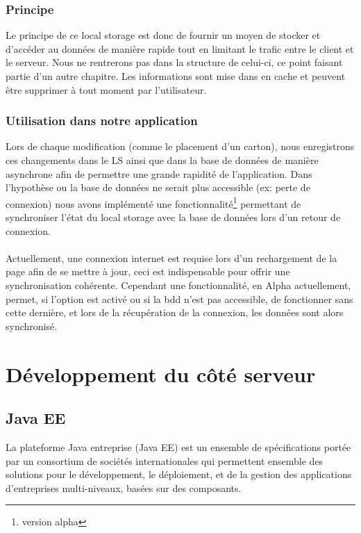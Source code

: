 \subsubsection{Principe}
Le principe de ce local storage est donc de fournir un moyen de stocker et d'accéder au données de manière rapide tout en limitant le trafic entre le client et le serveur. Nous ne rentrerons pas dans la structure de celui-ci, ce point faisant partie d'un autre chapitre. Les informations sont mise dans en cache et peuvent être supprimer à tout moment par l'utilisateur.
\subsubsection{Utilisation dans notre application}
Lors de chaque modification (comme le placement d'un carton), nous enregistrons ces changements dans le LS ainsi que dans la base de données de manière asynchrone afin de permettre une grande rapidité de l'application. Dans l'hypothèse ou la base de données ne serait plus accessible (ex: perte de connexion) nous avons implémenté une fonctionnalité\footnote{version alpha} permettant de synchroniser l'état du local storage avec la base de données lors d'un retour de connexion.\\
\\
Actuellement, une connexion internet est requise lors d'un rechargement de la page afin de se mettre à jour, ceci est indispensable pour offrir une synchronisation cohérente. Cependant une fonctionnalité, en Alpha actuellement, permet, si l'option est activé ou si la bdd n'est pas accessible, de fonctionner sans cette dernière, et lors de la récupération de la connexion, les données sont alors synchronisé.



\section{Développement du côté serveur}

\subsection{Java EE}

La plateforme Java entreprise (Java EE) est un ensemble de spécifications portée par un consortium de sociétés internationales qui permettent ensemble des solutions pour le développement, le déploiement, et de la gestion des applications d'entreprises multi-niveaux, basées sur des composants.

